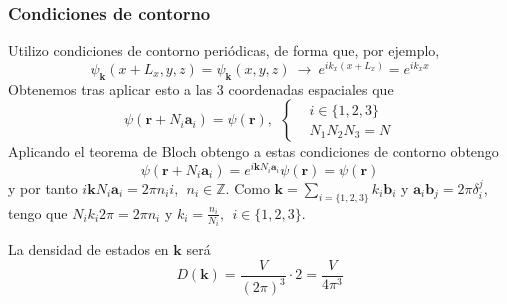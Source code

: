 \subsubsection*{Condiciones de contorno}
Utilizo condiciones de contorno periódicas, de forma que, por
ejemplo,
\begin{equation}
  \psi_\mathbf{k}(x+L_x, y,z) = \psi_\mathbf{k}(x,y,z) \ \rightarrow \
  e^{i k_x (x+L_x)} = e^{i k_x x}
\end{equation}
Obtenemos tras aplicar esto a las 3 coordenadas espaciales que
\begin{equation}
  \psi(\mathbf{r} + N_i \mathbf{a}_i) = \psi(\mathbf{r}), \ \
  \begin{cases}
    &i \in \{ 1,2,3\} \\
    &N_1N_2N_3 = N
  \end{cases}
\end{equation}
Aplicando el teorema de Bloch obtengo a estas condiciones de contorno obtengo
\begin{equation}
  \psi(\mathbf{r}+N_i \mathbf{a}_i) = e^{i \mathbf{k} N_i
    \mathbf{a}_i} \psi(\mathbf{r}) = \psi(\mathbf{r})
\end{equation}
y por tanto $i \mathbf{k}N_i \mathbf{a}_i = 2\pi n_i i, \ \ n_i\in
\mathbb{Z}$. Como $ \mathbf{k} = \sum_{i=\{1,2,3\}} k_i \mathbf{b}_i$
y $\mathbf{a}_i \mathbf{b}_j = 2\pi\delta_i^j$, tengo que $N_i k_i
2\pi = 2\pi n_i$ y $k_i= \frac{n_i}{N_i}, \ \ i\in\{1,2,3\}$.

La densidad de estados en $\mathbf{k}$ será
\begin{equation}
  D(\mathbf{k}) = \frac{V}{(2\pi)^3} \cdot 2 = \frac{V}{4\pi^3}
\end{equation}

